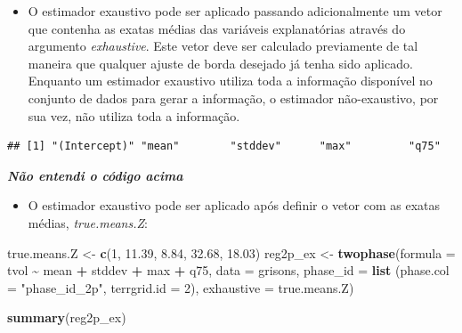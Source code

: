 \documentclass[
]{article}
\newenvironment{Shaded}{\begin{snugshade}}{\end{snugshade}}
\newcommand{\AttributeTok}[1]{\textcolor[rgb]{0.13,0.29,0.53}{#1}}
\newcommand{\ConstantTok}[1]{\textcolor[rgb]{0.56,0.35,0.01}{#1}}
\newcommand{\DecValTok}[1]{\textcolor[rgb]{0.00,0.00,0.81}{#1}}
\newcommand{\FloatTok}[1]{\textcolor[rgb]{0.00,0.00,0.81}{#1}}
\newcommand{\FunctionTok}[1]{\textcolor[rgb]{0.13,0.29,0.53}{\textbf{#1}}}
\newcommand{\NormalTok}[1]{#1}
\newcommand{\OtherTok}[1]{\textcolor[rgb]{0.56,0.35,0.01}{#1}}
\newcommand{\SpecialCharTok}[1]{\textcolor[rgb]{0.81,0.36,0.00}{\textbf{#1}}}
\newcommand{\StringTok}[1]{\textcolor[rgb]{0.31,0.60,0.02}{#1}}
\providecommand{\tightlist}{%
  \setlength{\itemsep}{0pt}\setlength{\parskip}{0pt}}
\begin{document}
\begin{itemize}
\tightlist
\item
  O estimador exaustivo pode ser aplicado passando adicionalmente um
  vetor que contenha as exatas médias das variáveis explanatórias
  através do argumento \emph{exhaustive}. Este vetor deve ser calculado
  previamente de tal maneira que qualquer ajuste de borda desejado já
  tenha sido aplicado. Enquanto um estimador exaustivo utiliza toda a
  informação disponível no conjunto de dados para gerar a informação, o
  estimador não-exaustivo, por sua vez, não utiliza toda a informação.
\end{itemize}

\begin{Shaded}
\end{Shaded}

\begin{verbatim}
## [1] "(Intercept)" "mean"        "stddev"      "max"         "q75"
\end{verbatim}

\textbf{\emph{Não entendi o código acima}}

\begin{itemize}
\tightlist
\item
  O estimador exaustivo pode ser aplicado após definir o vetor com as
  exatas médias, \emph{true.means.Z}:
\end{itemize}

\begin{Shaded}
\begin{Highlighting}[]
\NormalTok{true.means.Z }\OtherTok{\textless{}{-}} \FunctionTok{c}\NormalTok{(}\DecValTok{1}\NormalTok{, }\FloatTok{11.39}\NormalTok{, }\FloatTok{8.84}\NormalTok{, }\FloatTok{32.68}\NormalTok{, }\FloatTok{18.03}\NormalTok{)}
\NormalTok{reg2p\_ex }\OtherTok{\textless{}{-}} \FunctionTok{twophase}\NormalTok{(}\AttributeTok{formula =}\NormalTok{ tvol }\SpecialCharTok{\textasciitilde{}}\NormalTok{ mean }\SpecialCharTok{+}\NormalTok{ stddev }\SpecialCharTok{+}\NormalTok{ max }\SpecialCharTok{+}\NormalTok{ q75,}
                     \AttributeTok{data =}\NormalTok{ grisons, }\AttributeTok{phase\_id =} \FunctionTok{list}\NormalTok{ (}\AttributeTok{phase.col =} \StringTok{"phase\_id\_2p"}\NormalTok{,}
                      \AttributeTok{terrgrid.id =} \DecValTok{2}\NormalTok{), }\AttributeTok{exhaustive =}\NormalTok{ true.means.Z)}

\FunctionTok{summary}\NormalTok{(reg2p\_ex)}
\end{Highlighting}
\end{Shaded}
\end{document}
